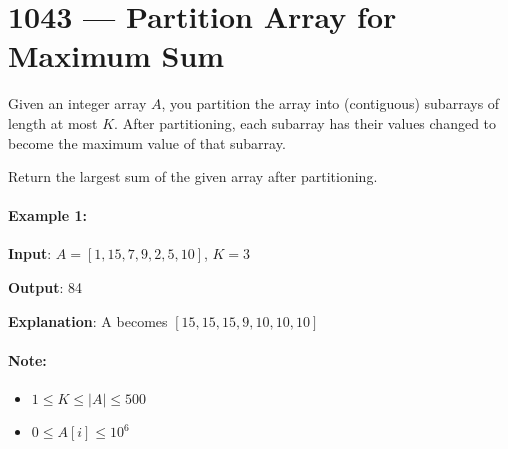 \section{1043 --- Partition Array for Maximum Sum}
Given an integer array $A$, you partition the array into (contiguous) subarrays of length at most $K$.  After partitioning, each subarray has their values changed to become the maximum value of that subarray.

Return the largest sum of the given array after partitioning.

\paragraph{Example 1:}

\begin{flushleft}
\textbf{Input}: $A = [1,15,7,9,2,5,10]$, $K = 3$

\textbf{Output}: 84

\textbf{Explanation}: A becomes $[15,15,15,9,10,10,10]$
 
\end{flushleft}

\paragraph{Note:}

\begin{itemize}
\item $1 \leq K \leq \lvert A\rvert \leq 500$
\item $0 \leq A[i] \leq 10^6$
\end{itemize}